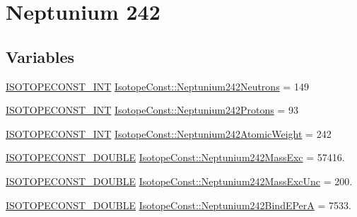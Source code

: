 \hypertarget{group___isotope_const-_neptunium-_np242}{}\section{Neptunium 242}
\label{group___isotope_const-_neptunium-_np242}
\subsection*{Variables}
\begin{DoxyCompactItemize}
\item 
\mbox{\hyperlink{group___isotope_const-_macros_ga5f18360b3e99483a35c32d789e62621c}{I\+S\+O\+T\+O\+P\+E\+C\+O\+N\+S\+T\+\_\+\+I\+NT}} \mbox{\hyperlink{group___isotope_const-_neptunium-_np242_ga068e4d8bb155c975e0773ac1cae4f76b}{Isotope\+Const\+::\+Neptunium242\+Neutrons}} = 149
\item 
\mbox{\hyperlink{group___isotope_const-_macros_ga5f18360b3e99483a35c32d789e62621c}{I\+S\+O\+T\+O\+P\+E\+C\+O\+N\+S\+T\+\_\+\+I\+NT}} \mbox{\hyperlink{group___isotope_const-_neptunium-_np242_ga550df8c80fc702f4f4db70046c9e8d38}{Isotope\+Const\+::\+Neptunium242\+Protons}} = 93
\item 
\mbox{\hyperlink{group___isotope_const-_macros_ga5f18360b3e99483a35c32d789e62621c}{I\+S\+O\+T\+O\+P\+E\+C\+O\+N\+S\+T\+\_\+\+I\+NT}} \mbox{\hyperlink{group___isotope_const-_neptunium-_np242_ga799af70eea14eba1641ad1df12789691}{Isotope\+Const\+::\+Neptunium242\+Atomic\+Weight}} = 242
\item 
\mbox{\hyperlink{group___isotope_const-_macros_ga8f45a7272ce02c0b4c65c44636ed719a}{I\+S\+O\+T\+O\+P\+E\+C\+O\+N\+S\+T\+\_\+\+D\+O\+U\+B\+LE}} \mbox{\hyperlink{group___isotope_const-_neptunium-_np242_gae5e35f35b128a6b90bc412b1b10d62a3}{Isotope\+Const\+::\+Neptunium242\+Mass\+Exc}} = 57416.
\item 
\mbox{\hyperlink{group___isotope_const-_macros_ga8f45a7272ce02c0b4c65c44636ed719a}{I\+S\+O\+T\+O\+P\+E\+C\+O\+N\+S\+T\+\_\+\+D\+O\+U\+B\+LE}} \mbox{\hyperlink{group___isotope_const-_neptunium-_np242_ga52e884562977ba2de9d19facb6bbb214}{Isotope\+Const\+::\+Neptunium242\+Mass\+Exc\+Unc}} = 200.
\item 
\mbox{\hyperlink{group___isotope_const-_macros_ga8f45a7272ce02c0b4c65c44636ed719a}{I\+S\+O\+T\+O\+P\+E\+C\+O\+N\+S\+T\+\_\+\+D\+O\+U\+B\+LE}} \mbox{\hyperlink{group___isotope_const-_neptunium-_np242_ga591cebf2760f713a14f3ac1bb8145f15}{Isotope\+Const\+::\+Neptunium242\+Bind\+E\+PerA}} = 7533.
\item 

\end{DoxyCompactItemize}
